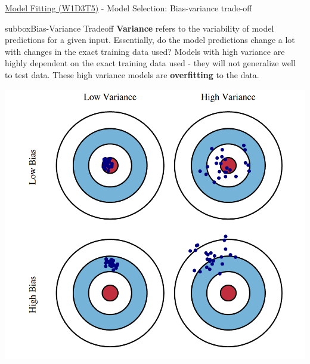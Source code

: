 \begin{textbox}{\href{https://compneuro.neuromatch.io/tutorials/W1D3_ModelFitting/student/W1D3_Tutorial5.html}{Model Fitting (W1D3T5)} -  Model Selection: Bias-variance trade-off}
\begin{subbox}{subbox}{Bias-Variance Tradeoff}
\textbf{Variance} refers to the variability of model predictions for a given input. Essentially, do the model predictions change a lot with changes in the exact training data used? Models with high variance are highly dependent on the exact training data used - they will not generalize well to test data. These high variance models are \textbf{overfitting} to the data.

\centering
\includegraphics[scale=0.13]{Figures/ModelFitting/MFFigure6.png}
\end{subbox}
\end{textbox}